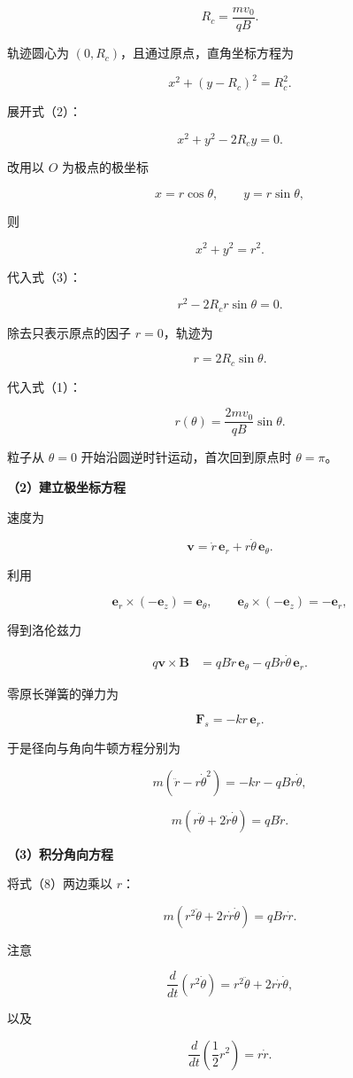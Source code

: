 \documentclass[12pt,a4paper,UTF8]{ctexart}
\begin{document}
\[R_c=\frac{mv_0}{qB}.\]

轨迹圆心为 \((0,R_c)\)，且通过原点，直角坐标方程为

\[x^2+(y-R_c)^2=R_c^2.\]

展开式（2）：

\[x^2+y^2-2R_cy=0.\]

改用以 \(O\) 为极点的极坐标

\[x=r\cos\theta,\qquad y=r\sin\theta,\]

则

\[x^2+y^2=r^2.\]

代入式（3）：

\[r^2-2R_cr\sin\theta=0.\]

除去只表示原点的因子 \(r=0\)，轨迹为

\[r=2R_c\sin\theta.\]

代入式（1）：

\[\boxed{r(\theta)=\frac{2mv_0}{qB}\sin\theta}.\]

粒子从 \(\theta=0\) 开始沿圆逆时针运动，首次回到原点时 \(\theta=\pi\)。

\textbf{（2）建立极坐标方程}

速度为

\[\bm v=\dot r\,\bm e_r+r\dot\theta\,\bm e_\theta.\]

利用

\[\bm e_r\times(-\bm e_z)=\bm e_\theta,
\qquad
\bm e_\theta\times(-\bm e_z)=-\bm e_r,\]

得到洛伦兹力

\[\begin{aligned}
q\bm v\times\bm B
&=qB\dot r\,\bm e_\theta-qBr\dot\theta\,\bm e_r.
\end{aligned}\]

零原长弹簧的弹力为

\[\bm F_s=-kr\,\bm e_r.\]

于是径向与角向牛顿方程分别为

\[m(\ddot r-r\dot\theta^2)=-kr-qBr\dot\theta,\]

\[m(r\ddot\theta+2\dot r\dot\theta)=qB\dot r.\]

\textbf{（3）积分角向方程}

将式（8）两边乘以 \(r\)：

\[m(r^2\ddot\theta+2r\dot r\dot\theta)=qBr\dot r.\]

注意

\[\frac{d}{dt}(r^2\dot\theta)=r^2\ddot\theta+2r\dot r\dot\theta,\]

以及

\[\frac{d}{dt}\left(\frac12r^2\right)=r\dot r.\]
\end{document}
